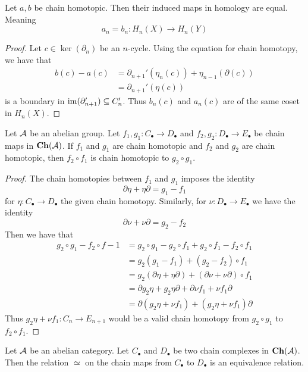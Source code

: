 \documentclass[a4paper]{article}
\begin{document}
\begin{lmm}{}{} Let $a,b$ be chain homotopic. Then their induced maps in homology are equal. Meaning $$a_n=b_n:H_n(X)\to H_n(Y)$$ \tcbline
\begin{proof}
Let $c\in\ker(\partial_n)$ be an $n$-cycle. Using the equation for chain homotopy, we have that 
\begin{align*}
b(c)-a(c)&=\partial_{n+1}'(\eta_n(c))+\eta_{n-1}(\partial(c))\\
&=\partial_{n+1}'(\eta(c))
\end{align*}
 is a boundary in $\operatorname{im}(\partial_{n+1}')\subseteq C_n'$. Thus $b_n(c)$ and $a_n(c)$ are of the same coset in $H_n(X)$. 
\end{proof}
\end{lmm}

\begin{prp}{}{} Let $\mathcal{A}$ be an abelian group. Let $f_1,g_1:C_\bullet\to D_\bullet$ and $f_2,g_2:D_\bullet\to E_\bullet$ be chain maps in $\bold{Ch}(\mathcal{A})$. If $f_1$ and $g_1$ are chain homotopic and $f_2$ and $g_2$ are chain homotopic, then $f_2\circ f_1$ is chain homotopic to $g_2\circ g_1$. \tcbline
\begin{proof}
The chain homotopies between $f_1$ and $g_1$ imposes the identity $$\partial\eta+\eta\partial=g_1-f_1$$ for $\eta:C_\bullet\to D_\bullet$ the given chain homotopy. Similarly, for $\nu:D_\bullet\to E_\bullet$ we have the identity $$\partial\nu+\nu\partial=g_2-f_2$$ Then we have that 
\begin{align*}
g_2\circ g_1-f_2\circ f-1&=g_2\circ g_1-g_2\circ f_1+g_2\circ f_1-f_2\circ f_1\\
&=g_2(g_1-f_1)+(g_2-f_2)\circ f_1\\
&=g_2(\partial\eta+\eta\partial)+(\partial\nu+\nu\partial)\circ f_1\\
&=\partial g_2\eta+g_2\eta\partial+\partial\nu f_1+\nu f_1\partial\\
&=\partial(g_2\eta+\nu f_1)+(g_2\eta+\nu f_1)\partial
\end{align*}
Thus $g_2\eta+\nu f_1:C_n\to E_{n+1}$ would be a valid chain homotopy from $g_2\circ g_1$ to $f_2\circ f_1$. 
\end{proof}
\end{prp}

\begin{lmm}{}{} Let $\mathcal{A}$ be an abelian category. Let $C_\bullet$ and $D_\bullet$ be two chain complexes in $\bold{Ch}(\mathcal{A})$. Then the relation $\simeq$ on the chain maps from $C_\bullet$ to $D_\bullet$ is an equivalence relation. 
\end{lmm}
\end{document}
